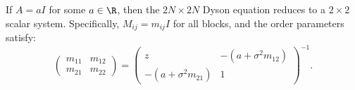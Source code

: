 \begin{corollary}\label{cor:scalar}
If $A = aI$ for some $a \in \R$, then the $2N \times 2N$ Dyson equation reduces to a $2 \times 2$ scalar system. Specifically, $M_{ij} = m_{ij} I$ for all blocks, and the order parameters satisfy:
\begin{equation}
\begin{pmatrix} m_{11} & m_{12} \\ m_{21} & m_{22} \end{pmatrix}
= \begin{pmatrix} z & -(a + \sigma^2 m_{12}) \\ -(a + \sigma^2 m_{21}) & 1 \end{pmatrix}^{-1}.
\end{equation}
\end{corollary}
